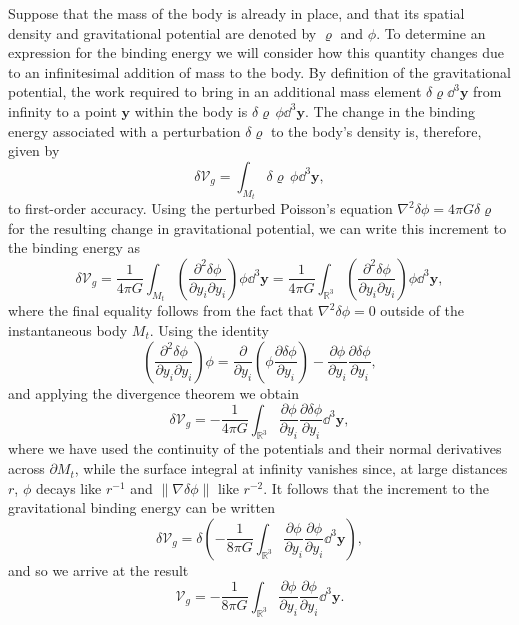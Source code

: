 Suppose that the mass of the body is already in place, 
and that its spatial density and gravitational potential are denoted by $\varrho$ and $\phi$. To determine an 
expression for the binding energy we will consider how this quantity changes due to an infinitesimal addition 
of mass to the body. By definition of the gravitational potential, the work required to bring in an additional 
mass element $\delta\varrho \dd^{3}\mathbf{y}$ from infinity to a point $\mathbf{y}$ within the body is
 $\delta\varrho\,\phi\dd^{3}\mathbf{y}$. 
The change in the binding energy associated with a perturbation $\delta\varrho$ to the body's density is, therefore, given by
\begin{equation}
\delta\mathcal{V}_{g}=\int_{M_{t}}\delta\varrho\,\phi \dd^{3}\mathbf{y},
\label{eq:11}
\end{equation}
to first-order accuracy. Using the perturbed Poisson's equation $\nabla^{2}\delta\phi=4\pi G\delta\varrho$ for 
the resulting change in gravitational potential, we can write this increment to the binding energy as
\begin{equation}
\delta\mathcal{V}_{g}=\frac{1}{4\pi G}\int_{M_{t}}\left(\frac{\partial^{2}\delta\phi}{\partial y_{i}\partial y_{i}}\right)\phi
\dd^{3}\mathbf{y}=\frac{1}{4\pi G}\int_{\mathbb{R}^{3}}\left(\frac{\partial^{2}\delta\phi}{\partial y_{i}\partial y_{i}}\right)\phi\dd^{3}\mathbf{y},
\label{eq:12}
\end{equation}
where the final equality follows from the fact that $\nabla^{2}\delta\phi=0$ outside of the instantaneous 
body $M_{t}$. Using the identity
\begin{equation}
\left(\frac{\partial^{2}\delta\phi}{\partial y_{i}\partial y_{i}}\right)\phi=\frac{\partial}{\partial y_{i}}
\left(\phi\frac{\partial\delta\phi}{\partial y_{i}}\right)-\frac{\partial\phi}{\partial y_{i}}\frac{\partial\delta\phi}{\partial y_{i}},
\label{eq:13}
\end{equation}
and applying the divergence theorem we obtain
\begin{equation}
\delta\mathcal{V}_{g}=-\frac{1}{4\pi G}\int_{\mathbb{R}^{3}}\frac{\partial\phi}{\partial y_{i}}\frac{\partial\delta\phi}{\partial y_{i}}\dd^{3}\mathbf{y},
\label{eq:14}
\end{equation}
where we have used the continuity of the potentials and their normal derivatives across $\partial M_{t}$, while the 
surface integral at infinity vanishes since, at large distances $r$, $\phi$ decays like $r^{-1}$ and $\|\nabla\delta\phi\|$ 
like $r^{-2}$. It follows that the increment to the gravitational binding energy can be written
\begin{equation}
\delta\mathcal{V}_{g}=\delta\left(-\frac{1}{8\pi G}\int_{\mathbb{R}^{3}}\frac{\partial\phi}{\partial y_{i}}
\frac{\partial\phi}{\partial y_{i}}\dd^{3}\mathbf{y}\right),
\label{eq:15}
\end{equation}
and so we arrive at the result
\begin{equation}
\mathcal{V}_{g}=-\frac{1}{8\pi G}\int_{\mathbb{R}^{3}}\frac{\partial\phi}{\partial y_{i}}\frac{\partial\phi}
{\partial y_{i}}\dd^{3}\mathbf{y}.
\label{eq:16}
\end{equation}

